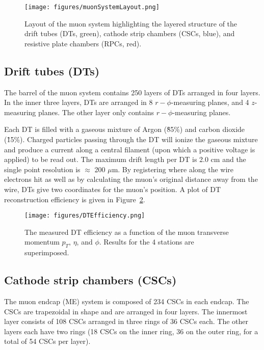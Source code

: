 \begin{figure}\centering
  \texttt{[image: figures/muonSystemLayout.png]}
  \caption{\label{fig:muonSystemLayout} Layout of the muon system highlighting the layered structure of the drift tubes (DTs, green), cathode strip chambers (CSCs, blue), and resistive plate chambers (RPCs, red).}
\end{figure}

\subsection{Drift tubes (DTs)}

The barrel of the muon system contains 250 layers of DTs arranged in four layers. In the inner three layers, DTs are arranged in 8 $r-\phi$-measuring planes, and 4 $z$-measuring planes. The other layer only contains $r-\phi$-measuring planes.

Each DT is filled with a gaseous mixture of Argon (\~85\%) and carbon dioxide (\~15\%). Charged particles passing through the DT will ionize the gaseous mixture and produce a current along a central filament (upon which a positive voltage is applied) to be read out. The maximum drift length per DT is 2.0 cm and the single point resolution is $\approx$ 200 $\mu$m. By registering where along the wire electrons hit as well as by calculating the muon's original distance away from the wire, DTs give two coordinates for the muon’s position. A plot of DT reconstruction efficiency is given in Figure~\ref{fig:DTEfficiency}.\cite{TDR}

\begin{figure}\centering
  \texttt{[image: figures/DTEfficiency.png]}
  \caption{\label{fig:DTEfficiency} The measured DT efficiency as a function of the muon transverse momentum $p_T$,
$\eta$, and $\phi$. Results for the 4 stations are superimposed.}
\end{figure}

\subsection{Cathode strip chambers (CSCs)}

The muon endcap (ME) system is composed of 234 CSCs in each endcap. The CSCs are trapezoidal in shape and are arranged in four layers. The innermost layer consists of 108 CSCs arranged in three rings of 36 CSCs each. The other layers each have two rings (18 CSCs on the inner ring, 36 on the outer ring, for a total of 54 CSCs per layer).\cite{Muon}

